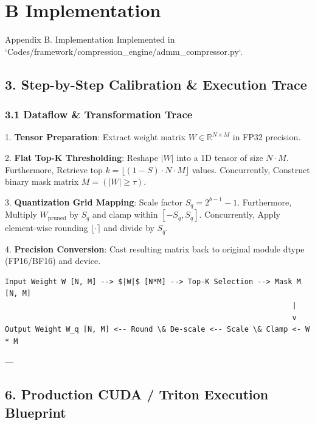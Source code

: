 \section{B Implementation}

 Appendix B. Implementation
Implemented in `Codes/framework/compression\_engine/admm\_compressor.py`.



\subsection{3. Step-by-Step Calibration \& Execution Trace}
\subsubsection{3.1 Dataflow \& Transformation Trace}

1. \textbf{Tensor Preparation}:
Extract weight matrix $W \in \mathbb{R}^{N \times M}$ in FP32 precision.

2. \textbf{Flat Top-K Thresholding}:
Reshape $|W|$ into a 1D tensor of size $N \cdot M$. Furthermore, Retrieve top $k = \lfloor (1 - S) \cdot N \cdot M \rfloor$ values. Concurrently, Construct binary mask matrix $M = (|W| \ge \tau)$.

3. \textbf{Quantization Grid Mapping}:
Scale factor $S_q = 2^{b-1} - 1$. Furthermore, Multiply $W_{\text{pruned}}$ by $S_q$ and clamp within $[-S_q, S_q]$. Concurrently, Apply element-wise rounding $\lfloor \cdot \rceil$ and divide by $S_q$.

4. \textbf{Precision Conversion}:
Cast resulting matrix back to original module dtype (FP16/BF16) and device.



\begin{lstlisting}
Input Weight W [N, M] --> $|W|$ [N*M] --> Top-K Selection --> Mask M [N, M]
                                                                  |
                                                                  v
Output Weight W_q [N, M] <-- Round \& De-scale <-- Scale \& Clamp <- W * M
\end{lstlisting}


---

\subsection{6. Production CUDA / Triton Execution Blueprint}

